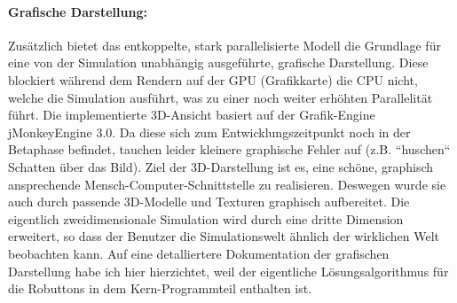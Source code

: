 \paragraph{Grafische Darstellung:}
Zusätzlich bietet das entkoppelte, stark parallelisierte Modell die Grundlage für eine von der Simulation unabhängig ausgeführte, grafische Darstellung.
Diese blockiert während dem Rendern auf der GPU (Grafikkarte) die CPU nicht, welche die Simulation ausführt, was zu einer noch weiter
erhöhten Parallelität führt.
Die implementierte 3D-Ansicht basiert auf der Grafik-Engine jMonkeyEngine 3.0. Da diese sich zum Entwicklungszeitpunkt noch in der
Betaphase befindet, tauchen leider kleinere graphische Fehler auf (z.B. ``huschen`` Schatten über das Bild). Ziel der 3D-Darstellung ist es,
eine schöne, graphisch ansprechende Mensch-Computer-Schnittstelle zu realisieren. Deswegen wurde sie auch durch passende 3D-Modelle und
Texturen graphisch aufbereitet.
Die eigentlich zweidimensionale Simulation wird durch eine dritte Dimension erweitert, so dass der Benutzer die Simulationswelt ähnlich der wirklichen Welt beobachten kann.
Auf eine detalliertere Dokumentation der grafischen Darstellung habe ich hier hierzichtet, weil der eigentliche Lösungsalgorithmus für die Robuttons
in dem Kern-Programmteil enthalten ist.
\newpage
